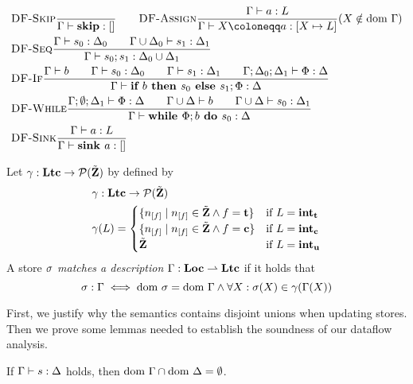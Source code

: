 \begin{align*}
    &\trule{DF-Skip}{}{\typestep{\Gamma}{\skipcmd}{[]}}\qquad
    \trule{DF-Assign}{\typestep{\Gamma}{a}{L}}
    {\typestep{\Gamma}{\defaultstore}{[X \mapsto L]}} \text{($X \notin \dom\Gamma$)}\\
    &\trule{DF-Seq}{\typestep{\Gamma}{s_0}{\Delta_0}\qquad
    \typestep{\Gamma \cup \Delta_0}{s_1}{\Delta_1}}{\typestep{\Gamma}{\defaultssaseq}{\Delta_0 \cup \Delta_1}}\\
    &\trule{DF-If}{\typestmt{\Gamma}{b}\qquad\typestep{\Gamma}{s_0}{\Delta_0}\qquad \typestep{\Gamma}{s_1}{\Delta_1}\qquad
    \typestep{\Gamma;\Delta_0;\Delta_1}{\philist}{\Delta}}
    {\typestep{\Gamma}{\defaultssaif}{\Delta}}\\
    &\trule{DF-While}{\typestep{\Gamma;\emptyset;\Delta_1}{\philist}{\Delta}\qquad
    \typestmt{\Gamma \cup \Delta}{b}\qquad\typestep{\Gamma \cup \Delta}{s_0}{\Delta_1}}
    {\typestep{\Gamma}{\defaultssawhile}{\Delta}}\\
    &\trule{DF-Sink}{\typestep{\Gamma}{a}{L}}{\typestep{\Gamma}{\sink{a}}{[]}}\\
\end{align*}

\begin{definition}
    Let $\gamma:\textbf{Ltc} \to \operatorname{\mathcal{P}}(\tilde{\textbf{Z}})$ by defined by
    \begin{align*}
        &\gamma:\lattice \to \P(\StoreDomain)\\
        &\gamma(L) = \begin{cases}
            \{\flagged{} \mid \flagged{} \in \StoreDomain \land f = \textbf{t}\} & \text{if }L = \ltracked\\
            \{\flagged{} \mid \flagged{} \in \StoreDomain \land  f = \textbf{c}\} & \text{if }L = \lclean\\
            \StoreDomain & \text{if }L = \lunknown\\
        \end{cases}
    \end{align*}
    A store $\sigma$ \emph{matches a description} $\Gamma: \textbf{Loc} \rightharpoonup \textbf{Ltc}$ if it holds that
    \begin{equation*}
        {\sigma}:{\Gamma} \;\Longleftrightarrow\; \text{dom }{\sigma} = \text{dom }{\Gamma} \land \forall X: \sigma(X) \in \gamma(\Gamma(X))
    \end{equation*}
\end{definition}

First, we justify why the semantics contains disjoint unions when updating stores.
Then we prove some lemmas needed to establish the soundness of our dataflow analysis.
\begin{theorem}
    \label{thm:gamma-delta-disjoint}
    If $\Gamma \vdash {s}: \Delta$ holds, then $\text{dom }{\Gamma} \cap \text{dom }{\Delta} = \emptyset$.
\end{theorem}


